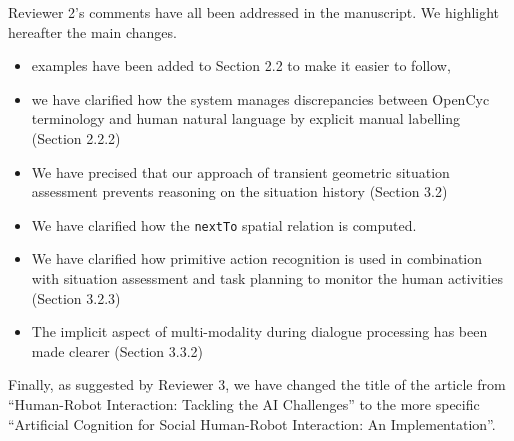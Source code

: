 \documentclass{article}
\begin{document}
Reviewer 2's comments have all been addressed in the manuscript.
We highlight hereafter the main changes.

\begin{itemize}
    \item examples have been added to Section 2.2 to make it easier to follow,
    \item we have clarified how the system manages discrepancies between OpenCyc
        terminology and human natural language by explicit manual labelling
        (Section 2.2.2)
    \item We have precised that our approach of transient geometric situation assessment
        prevents reasoning on the situation history (Section 3.2)
    \item We have clarified how the {\tt nextTo} spatial relation is computed.
    \item We have clarified how primitive action recognition is used in
        combination with situation assessment and task planning to monitor the
        human activities (Section 3.2.3)
    \item The implicit aspect of multi-modality during dialogue processing has
        been made clearer (Section 3.3.2)
\end{itemize}


Finally, as suggested by Reviewer 3, we have changed the title of the article
from ``Human-Robot Interaction: Tackling the AI Challenges'' to the more
specific ``Artificial Cognition for Social Human-Robot Interaction: An
Implementation''.




\end{document}

